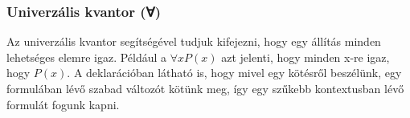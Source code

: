 \subsubsection{Univerzális kvantor (∀)}

Az univerzális kvantor segítségével tudjuk kifejezni, hogy egy állítás minden lehetséges elemre igaz. Például a $∀x P(x)$ azt jelenti, hogy minden x-re igaz, hogy $P(x)$. A deklarációban látható is, hogy mivel egy kötésről beszélünk, egy formulában lévő szabad változót kötünk meg, így egy szűkebb kontextusban lévő formulát fogunk kapni.
\begin{code}%
%
\>[6]\AgdaSpace{}%
\AgdaSymbol{:}\AgdaSpace{}%
\AgdaSymbol{\}}\AgdaSpace{}%
\AgdaSpace{}%
\AgdaSpace{}%
\AgdaSymbol{(}\AgdaSpace{}%
\AgdaSymbol{)}\AgdaSpace{}%
\AgdaSpace{}%
\AgdaSpace{}%
\<%
\end{code}


